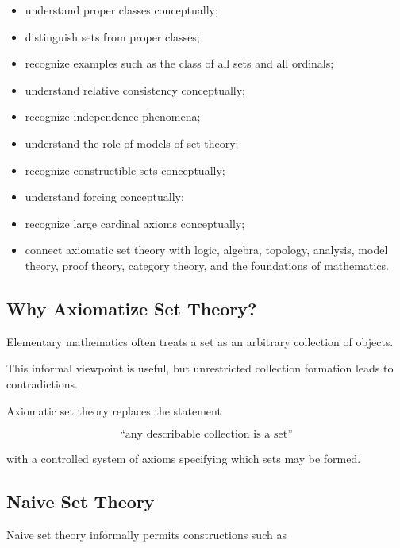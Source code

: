 {\begin{itemize}
    \item understand proper classes conceptually;
    \item distinguish sets from proper classes;
    \item recognize examples such as the class of all sets and all ordinals;
    \item understand relative consistency conceptually;
    \item recognize independence phenomena;
    \item understand the role of models of set theory;
    \item recognize constructible sets conceptually;
    \item understand forcing conceptually;
    \item recognize large cardinal axioms conceptually;
    \item connect axiomatic set theory with logic, algebra, topology,
          analysis, model theory, proof theory, category theory, and the
          foundations of mathematics.
\end{itemize}
}

\subsection{Why Axiomatize Set Theory?}
\label{subsec:why-axiomatize-set-theory}

Elementary mathematics often treats a set as an arbitrary collection of
objects.

This informal viewpoint is useful, but unrestricted collection formation
leads to contradictions.

Axiomatic set theory replaces the statement

\[
\boxed{
\text{``any describable collection is a set''}
}
\]

with a controlled system of axioms specifying which sets may be formed.

\subsection{Naive Set Theory}
\label{subsec:naive-set-theory}

Naive set theory informally permits constructions such as

